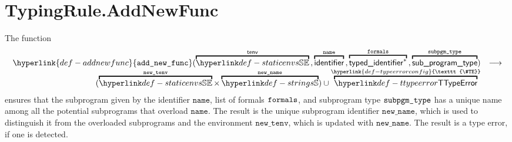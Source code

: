 \documentclass{book}
\newcommand\TypeErrorConfig[0]{\hyperlink{def-typeerrorconfig}{\texttt{\#TE}}}
\newcommand\addnewfunc[0]{\hyperlink{def-addnewfunc}{\texttt{add\_new\_func}}}
\newcommand\newtenv[0]{\texttt{new\_tenv}}
\newcommand\name[0]{\texttt{name}}
\newcommand\newname[0]{\texttt{new\_name}}
\begin{document}
\section{TypingRule.AddNewFunc \label{sec:TypingRule.AddNewFunc}}
\hypertarget{def-addnewfunc}{}
The function
\[
  \begin{array}{rl}
  \addnewfunc(
    \overname{\staticenvs}{\tenv} \aslsep
    \overname{\identifier}{\name} \aslsep
    \overname{\typedidentifier^*}{\formals} \aslsep
    \overname{\subprogramtype}{\subpgmtype})
  & \aslto\\
  (\overname{\staticenvs}{\newtenv} \times \overname{\Strings}{\newname})
  \cup \overname{\TTypeError}{\TypeErrorConfig} &
  \end{array}
\]
ensures that the subprogram given by the identifier $\name$, list of formals $\texttt{formals}$,
and subprogram type $\texttt{subpgm\_type}$ has a unique name among all the potential subprograms
that overload $\name$.
The result is the unique subprogram identifier $\newname$, which is used to distinguish it from the overloaded
subprograms and the environment $\newtenv$, which is updated with $\newname$.
The result is a type error, if one is detected.
\end{document}
